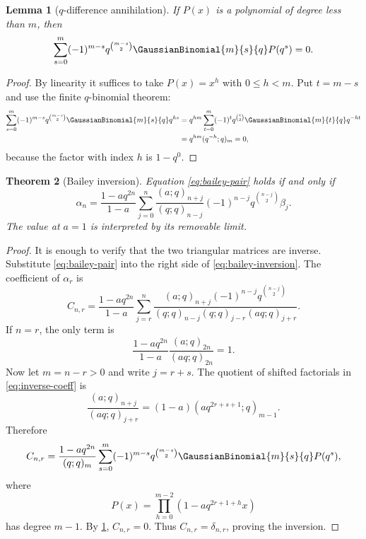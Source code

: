 \documentclass[11pt]{article}
\theoremstyle{blueplain}
\newtheorem{theorem}{Theorem}[section]
\newtheorem{lemma}[theorem]{Lemma}
\theoremstyle{bluedef}
\begin{document}
\begin{lemma}[$q$-difference annihilation]\label{lem:q-annihilation}
If $P(x)$ is a polynomial of degree less than $m$, then
\begin{equation}\label{eq:q-annihilation}
\sum_{s=0}^{m}(-1)^{m-s}q^{\binom{m-s}{2}}
\GaussianBinomial{m}{s}{q} P(q^s)=0.
\end{equation}
\end{lemma}

\begin{proof}
By linearity it suffices to take $P(x)=x^h$ with $0\le h<m$.  Put $t=m-s$ and use the finite $q$-binomial theorem:
\begin{align*}
\sum_{s=0}^{m}(-1)^{m-s}q^{\binom{m-s}{2}}\GaussianBinomial{m}{s}{q} q^{hs}
&=q^{hm}\sum_{t=0}^{m}(-1)^tq^{\binom t2}\GaussianBinomial{m}{t}{q} q^{-ht}\\
&=q^{hm}(q^{-h};q)_m=0,
\end{align*}
because the factor with index $h$ is $1-q^0$.
\end{proof}

\begin{theorem}[Bailey inversion]\label{thm:bailey-inversion}
Equation \eqref{eq:bailey-pair} holds if and only if
\begin{equation}\label{eq:bailey-inversion}
\alpha_n=\frac{1-aq^{2n}}{1-a}
\sum_{j=0}^{n}
\frac{(a;q)_{n+j}}{(q;q)_{n-j}}
(-1)^{n-j}q^{\binom{n-j}{2}}\beta_j.
\end{equation}
The value at $a=1$ is interpreted by its removable limit.
\end{theorem}

\begin{proof}
It is enough to verify that the two triangular matrices are inverse.  Substitute \eqref{eq:bailey-pair} into the right side of \eqref{eq:bailey-inversion}.  The coefficient of $\alpha_r$ is
\begin{equation}\label{eq:inverse-coeff}
C_{n,r}=\frac{1-aq^{2n}}{1-a}
\sum_{j=r}^{n}
\frac{(a;q)_{n+j}(-1)^{n-j}q^{\binom{n-j}{2}}}
{(q;q)_{n-j}(q;q)_{j-r}(aq;q)_{j+r}}.
\end{equation}
If $n=r$, the only term is
\[
\frac{1-aq^{2n}}{1-a}\frac{(a;q)_{2n}}{(aq;q)_{2n}}=1.
\]
Now let $m=n-r>0$ and write $j=r+s$.  The quotient of shifted factorials in \eqref{eq:inverse-coeff} is
\[
\frac{(a;q)_{n+j}}{(aq;q)_{j+r}}
=(1-a)(aq^{2r+s+1};q)_{m-1}.
\]
Therefore
\[
C_{n,r}=\frac{1-aq^{2n}}{(q;q)_m}
\sum_{s=0}^{m}(-1)^{m-s}q^{\binom{m-s}{2}}
\GaussianBinomial{m}{s}{q} P(q^s),
\]
where
\[
P(x)=\prod_{h=0}^{m-2}(1-aq^{2r+1+h}x)
\]
has degree $m-1$.  By \cref{lem:q-annihilation}, $C_{n,r}=0$.  Thus $C_{n,r}=\delta_{n,r}$, proving the inversion.
\end{proof}
\end{document}

